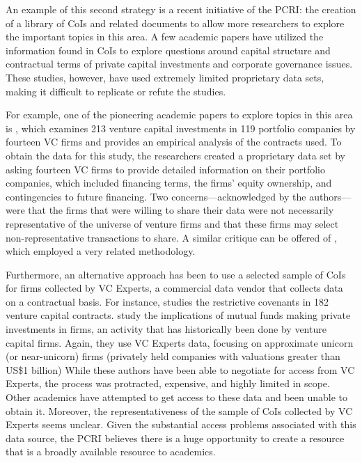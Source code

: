 An example of this second strategy is a recent initiative of the PCRI: the creation of a library of CoIs and related documents to allow more researchers to explore the important topics in this area. A few academic papers have utilized the information found in CoIs to explore questions around capital structure and contractual terms of private capital investments and corporate governance issues. These studies, however, have used extremely limited proprietary data sets, making it difficult to replicate or refute the studies.

For example, one of the pioneering academic papers to explore topics in this area is \citet{kaplan2003}, which examines 213 venture capital investments in 119 portfolio companies by fourteen VC firms and provides an empirical analysis of the contracts used. To obtain the data for this study, the researchers created a proprietary data set by asking fourteen VC firms to provide detailed information on their portfolio companies, which included financing terms, the firms' equity ownership, and contingencies to future financing. Two concerns---acknowledged by the authors---were that the firms that were willing to share their data were not necessarily representative of the universe of venture firms and that these firms may select non-representative transactions to share. A similar critique can be offered of \citet{lerner2005}, which employed a very related methodology.

Furthermore, an alternative approach has been to use a selected sample of CoIs for firms collected by VC Experts, a commercial data vendor that collects data on a contractual basis. For instance, \citet{bengtsson2011} studies the restrictive covenants in 182 venture capital contracts. \citet{chernenko2019} study the implications of mutual funds making private investments in firms, an activity that has historically been done by venture capital firms. Again, they use VC Experts data, focusing on approximate unicorn (or near-unicorn) firms (privately held companies with valuations greater than US\$1 billion) While these authors have been able to negotiate for access from VC Experts, the process was protracted, expensive, and highly limited in scope. Other academics have attempted to get access to these data and been unable to obtain it. Moreover, the representativeness of the sample of CoIs collected by VC Experts seems unclear. Given the substantial access problems associated with this data source, the PCRI believes there is a huge opportunity to create a resource that is a broadly available resource to academics.

